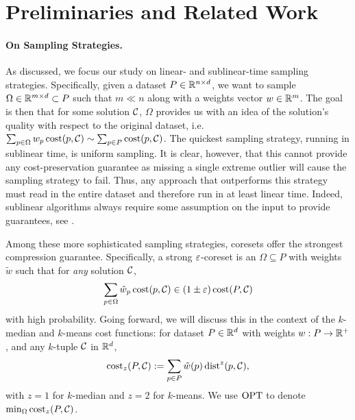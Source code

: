\section{Preliminaries and Related Work}
\label{sec:preliminaries}

\paragraph*{On Sampling Strategies.}
\label{ssec:sens_sampling}

As discussed, we focus our study on linear- and sublinear-time sampling strategies. Specifically, given a dataset $P \in \mathbb{R}^{n \times d}$, we want to sample
$\Omega \in \mathbb{R}^{m \times d} \subset P$ such that $m \ll n$ along with a weights vector $w \in \mathbb{R}^m$. The goal is then that for some solution $\mathcal C$, $\Omega$
provides us with an idea of the solution's quality with respect to the original dataset, i.e. $\sum_{p \in \Omega} w_p \operatorname{cost}(p, \mathcal C) \sim \sum_{p \in P}
\operatorname{cost}(p, \mathcal C)$.  The quickest sampling strategy, running in sublinear time, is uniform sampling. It is clear, however, that this cannot provide any
cost-preservation guarantee as missing a single extreme outlier will cause the sampling strategy to fail. Thus, any approach that outperforms this strategy must
read in the entire dataset and therefore run in at least linear time. Indeed, sublinear algorithms always require some assumption on the input to provide
guarantees, see \cite{Ben-David07,czumaj2007sublinear,HJJ23,meyerson2004k}.


Among these more sophisticated sampling strategies, coresets offer the strongest compression guarantee. Specifically, a strong $\varepsilon$-coreset is an 
$\Omega
\subseteq P$ with weights $\tilde w$ such that for \emph{any} solution $\mathcal C$, \[\sum_{p \in \Omega} \tilde w_p \operatorname{cost}(p, \mathcal C) \in (1 \pm \varepsilon) \operatorname{cost}(P, \mathcal C)\] with
high probability.  Going forward, we will discuss this in the context of the $k$-median and $k$-means cost functions: for dataset $P \in \mathbb{R}^d$ with weights $w
: P \rightarrow \mathbb{R}^+$, and any $k$-tuple $\mathcal C$ in $\mathbb{R}^d$, \[\operatorname{cost}_z(P, \mathcal C) := \sum_{p \in P} \tilde w(p) \operatorname{dist}^z(p, \mathcal C),\] with
$z=1$ for $k$-median and $z=2$ for $k$-means. We use $\text{OPT}$ to denote $\min_{\Omega} \operatorname{cost}_z(P, \mathcal C)$.

